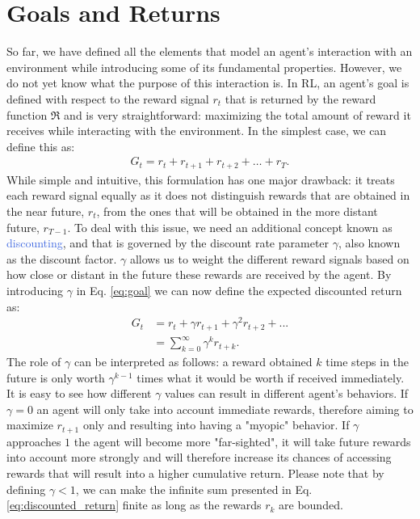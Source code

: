 \section{Goals and Returns}
\label{sec:goals_and_returns}
So far, we have defined all the elements that model an agent's interaction with an environment while introducing some of its fundamental properties. However, we do not yet know what the purpose of this interaction is. In RL, an agent's goal is defined with respect to the reward signal $r_t$ that is returned by the reward function $\Re$ and is very straightforward: maximizing the total amount of reward it receives while interacting with the environment. In the simplest case, we can define this as:
\begin{align}
	G_t = r_t + r_{t+1} + r_{t+2} + \ldots + r_{T}.
\label{eq:goal}
\end{align}
While simple and intuitive, this formulation has one major drawback: it treats each reward signal equally as it does not distinguish rewards that are obtained in the near future, $r_t$, from the ones that will be obtained in the more distant future, $r_{T-1}$. To deal with this issue, we need an additional concept known as \textcolor{RoyalBlue}{discounting}, and that is governed by the discount rate parameter $\gamma$, also known as the discount factor. $\gamma$ allows us to weight the different reward signals based on how close or distant in the future these rewards are received by the agent. By introducing $\gamma$ in Eq. \ref{eq:goal} we can now define the expected discounted return as:
\begin{equation}
	\begin{split}
	G_t & = r_t+\gamma r_{t+1} + \gamma^{2} r_{t+2} + ... \\
	    & = \sum_{k=0}^{\infty}\gamma^{k} r_{t+k}.
	\end{split}
\label{eq:discounted_return}
\end{equation}
The role of $\gamma$ can be interpreted as follows: a reward obtained $k$ time steps in the future is only worth $\gamma^{k-1}$ times what it would be worth if received immediately. It is easy to see how different $\gamma$ values can result in different agent's behaviors. If $\gamma=0$ an agent will only take into account immediate rewards, therefore aiming to maximize $r_{t+1}$ only and resulting into having a "myopic" behavior. If $\gamma$ approaches $1$ the agent will become more "far-sighted", it will take future rewards into account more strongly and will therefore increase its chances of accessing rewards that will result into a higher cumulative return. 
Please note that by defining $\gamma < 1$, we can make the infinite sum presented in Eq. \ref{eq:discounted_return} finite as long as the rewards $r_k$ are bounded.

